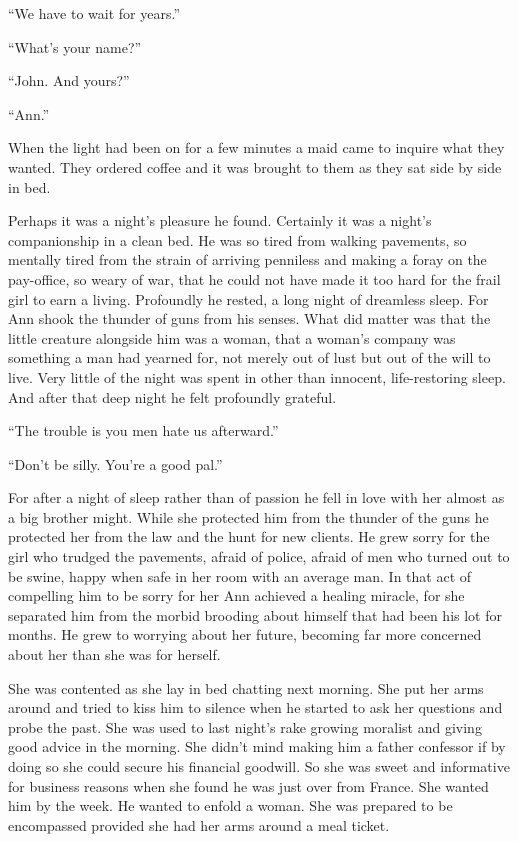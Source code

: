 ``We have to wait for years.''

``What's your name?''

``John. And yours?''

``Ann.''

When the light had been on for a few minutes a maid came to inquire what they wanted. They ordered coffee and it was brought to them as they sat side by side in bed.

Perhaps it was a night's pleasure he found. Certainly it was a night's companionship in a clean bed. He was so tired from walking pavements, so mentally tired from the strain of arriving penniless and making a foray on the pay-office, so weary of war, that he could not have made it too hard for the frail girl to earn a living. Profoundly he rested, a long night of dreamless sleep. For Ann shook the thunder of guns from his senses. What did matter was that the little creature alongside him was a woman, that a woman's company was something a man had yearned for, not merely out of lust but out of the will to live. Very little of the night was spent in other than innocent, life-restoring sleep. And after that deep night he felt profoundly grateful.

``The trouble is you men hate us afterward.''

``Don't be silly. You're a good pal.''

For after a night of sleep rather than of passion he fell in love with her almost as a big brother might. While she protected him from the thunder of the guns he protected her from the law and the hunt for new clients. He grew sorry for the girl who trudged the pavements, afraid of police, afraid of men who turned out to be swine, happy when safe in her room with an average man. In that act of compelling him to be sorry for her Ann achieved a healing miracle, for she separated him from the morbid brooding about himself that had been his lot for months. He grew to worrying about her future, becoming far more concerned about her than she was for herself.

She was contented as she lay in bed chatting next morning. She put her arms around and tried to kiss him to silence when he started to ask her questions and probe the past. She was used to last night's rake growing moralist and giving good advice in the morning. She didn't mind making him a father confessor if by doing so she could secure his financial goodwill. So she was sweet and informative for business reasons when she found he was just over from France. She wanted him by the week. He wanted to enfold a woman. She was prepared to be encompassed provided she had her arms around a meal ticket.

